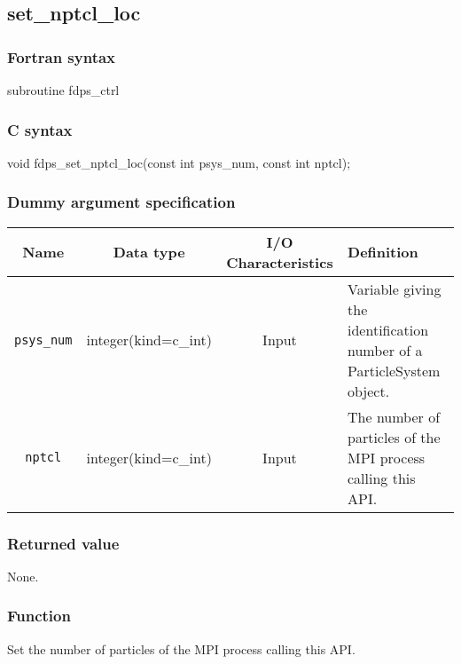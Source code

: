 \clearpage

\subsection{set\_nptcl\_loc}
\subsubsection*{Fortran syntax}
\begin{screen}
\begin{spverbatim}
subroutine fdps_ctrl%
\end{spverbatim}
\end{screen}

\subsubsection*{C syntax}
\begin{screen}
\begin{spverbatim}
void fdps_set_nptcl_loc(const int psys_num,
                        const int nptcl);
\end{spverbatim}
\end{screen}

\subsubsection*{Dummy argument specification}
\begin{table}[h]
\begin{tabularx}{\linewidth}{cccX}
\toprule
\rowcolor{Snow2}
Name & Data type & I/O Characteristics & Definition \\   
\midrule
\texttt{psys\_num} & integer(kind=c\_int) & Input & Variable giving the identification number of a ParticleSystem object.\\
\texttt{nptcl} & integer(kind=c\_int) & Input & The number of particles of the MPI process calling this API. \\
\bottomrule
\end{tabularx}
\end{table}

\subsubsection*{Returned value}
None.

\subsubsection*{Function}
Set the number of particles of the MPI process calling this API.

